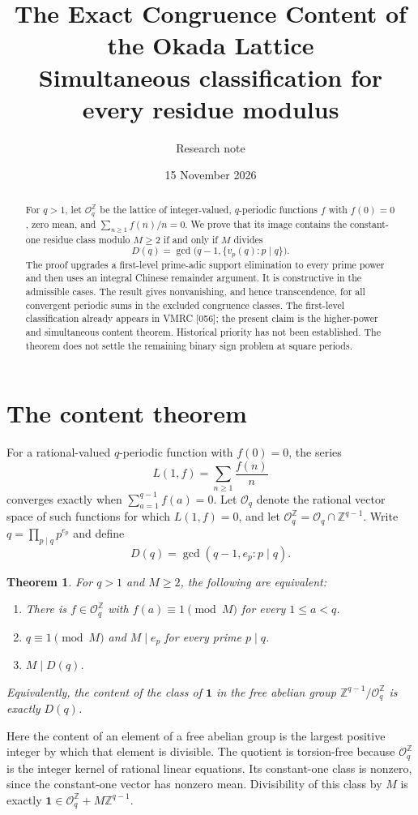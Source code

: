 \documentclass[11pt]{article}
\title{The Exact Congruence Content of the Okada Lattice\\\large Simultaneous classification for every residue modulus}
\author{Research note}
\date{15 November 2026}
\newtheorem{theorem}{Theorem}
\newcommand{\Z}{\mathbb Z}
\newcommand{\OO}{\mathcal O}
\begin{document}
\maketitle
\begin{abstract}
For $q>1$, let $\OO_q^{\Z}$ be the lattice of integer-valued, $q$-periodic functions $f$ with $f(0)=0$, zero mean, and $\sum_{n\ge1}f(n)/n=0$. We prove that its image contains the constant-one residue class modulo $M\ge2$ if and only if $M$ divides
\[
 D(q)=\gcd\bigl(q-1,\{v_p(q):p\mid q\}\bigr).
\]
The proof upgrades a first-level prime-adic support elimination to every prime power and then uses an integral Chinese remainder argument. It is constructive in the admissible cases. The result gives nonvanishing, and hence transcendence, for all convergent periodic sums in the excluded congruence classes. The first-level classification already appears in VMRC [056]; the present claim is the higher-power and simultaneous content theorem. Historical priority has not been established. The theorem does not settle the remaining binary sign problem at square periods.
\end{abstract}

\section{The content theorem}
For a rational-valued $q$-periodic function with $f(0)=0$, the series
\[
 L(1,f)=\sum_{n\ge1}\frac{f(n)}n
\]
converges exactly when $\sum_{a=1}^{q-1}f(a)=0$. Let $\OO_q$ denote the rational vector space of such functions for which $L(1,f)=0$, and let $\OO_q^{\Z}=\OO_q\cap\Z^{q-1}$. Write $q=\prod_{p\mid q}p^{e_p}$ and define
\[
 D(q)=\gcd(q-1,e_p:p\mid q).
\]

\begin{theorem}\label{thm:main}
For $q>1$ and $M\ge2$, the following are equivalent:
\begin{enumerate}
\item There is $f\in\OO_q^{\Z}$ with $f(a)\equiv1\pmod M$ for every $1\le a<q$.
\item $q\equiv1\pmod M$ and $M\mid e_p$ for every prime $p\mid q$.
\item $M\mid D(q)$.
\end{enumerate}
Equivalently, the content of the class of $\boldsymbol 1$ in the free abelian group $\Z^{q-1}/\OO_q^{\Z}$ is exactly $D(q)$.
\end{theorem}

Here the content of an element of a free abelian group is the largest positive integer by which that element is divisible. The quotient is torsion-free because $\OO_q^{\Z}$ is the integer kernel of rational linear equations. Its constant-one class is nonzero, since the constant-one vector has nonzero mean. Divisibility of this class by $M$ is exactly $\boldsymbol 1\in\OO_q^{\Z}+M\Z^{q-1}$.
\end{document}
